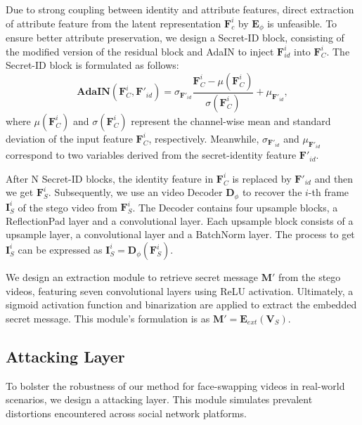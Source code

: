 \documentclass{article}
\begin{document}
Due to strong coupling between identity and attribute features, direct extraction of attribute feature from the latent representation $\bm{F}_{c}^{i}$ by $\bm{E}_{\phi}$ is unfeasible. To ensure better attribute preservation, we design a Secret-ID block, consisting of the modified version of the residual block and AdaIN to inject $\bm{F}_{id}^{i}$ into $\bm{F}_{C}^{i}$.
The Secret-ID block is formulated as follows:
\begin{equation}
\bm{AdaIN}(\bm{F}^i_{C},\bm{F}'_{id}) = \sigma _{\bm{F}'_{id}} \frac{\bm{F}^i_{C}-\mu (\bm{F}^i_{C})}{\sigma (\bm{F}^i_{C})} +\mu _ {\bm{F}'_{id}} ,
\label{eqn_adain}
\end{equation}
where $\mu ({\bm{F}^i_{C}})$ and $\sigma ( {\bm{F}^i_{C}})$ represent the channel-wise mean and standard deviation of the input feature $\bm{F}^i_{C}$, respectively. Meanwhile, $\sigma _{\bm{F}'_{id}}$ and $\mu _{\bm{F}'_{id}}$ correspond to two variables derived from the secret-identity feature $\bm{F}'_{id}$.

After N Secret-ID blocks, the identity feature in $\bm{F}_{C}^{i}$ is replaced by $\bm{F}'_{id}$ and then we get $\bm{F}^{i}_{S}$. Subsequently, we use an video Decoder $\bm{D}_{\phi}$ to recover the $i$-th frame $\bm{I}_{S}^{i}$ of the stego video from $\bm{F}^{i}_{S}$. The Decoder contains four upsample blocks, a ReflectionPad layer and a convolutional layer. Each upsample block consists of a upsample layer, a convolutional layer and a BatchNorm layer. The process to get $\bm{I}^{i}_{S}$ can be expressed as $\bm{I}^{i}_{S} = \bm{D}_{\phi} (\bm{F}^{i}_{S})$.

We design an extraction module to retrieve secret message $\bm{M}'$ from the stego videos, featuring seven convolutional layers using ReLU activation. Ultimately, a sigmoid activation function and binarization are applied to extract the embedded secret message. This module's formulation is as $\bm{M}' = \bm{E}_{ext}\left(\bm{V}_S\right)$.

\subsection{Attacking Layer} 
To bolster the robustness of our method for face-swapping videos in real-world scenarios, we design a attacking layer. This module simulates prevalent distortions encountered across social network platforms.
\end{document}
